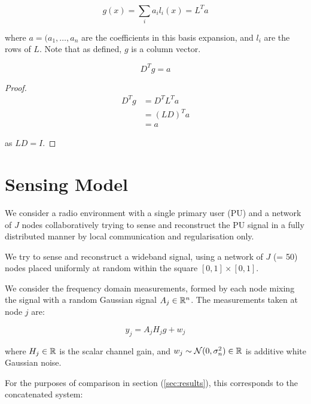 \begin{equation}
g\left(x\right) = \sum_i a_i l_i\left(x\right) = L^Ta
\label{basis-expansion}
\end{equation}

where \(a = (a_1, \ldots, a_n\) are the coefficients in this basis expansion, and \(l_i\) are the rows of \(L\). Note that as defined, \(g\) is a column vector.

\begin{proposition}
\begin{equation}
D^Tg = a
\end{equation}
\label{def:a}
\end{proposition}
\begin{proof}

\begin{align}
D^Tg &= D^T L^T a \\
&= \left(LD\right)^Ta \\
&= a
\end{align}

as \(LD = I\).

\end{proof}

\section{Sensing Model}\label{sec:sensingmodel}

We consider a radio environment with a single primary user (PU) and a network of \(J\) nodes collaboratively trying to sense and reconstruct the PU signal in a fully distributed manner by local communication and regularisation only.

We try to sense and reconstruct a wideband signal, using a network of \(J\) (= 50) nodes placed uniformly at random within the square \(  \left[0,1\right]\times \left[0,1\right] \). 

We consider the frequency domain measurements, formed by each node mixing the signal with a random Gaussian signal \(A_j \in {\mathbb{R}}^n\). The measurements taken at node \(j\) are:

\begin{equation}
y_j = A_jH_jg + w_j
\label{dist_system}
\end{equation}

where \(H_j \in {\mathbb{R}}\) is the scalar channel gain, and \(w_j \sim \mathcal{N}(0,\sigma^2_n) \in {\mathbb{R}} \) is additive white Gaussian noise. 

For the purposes of comparison in section (\ref{sec:results}), this corresponds to the concatenated system:

